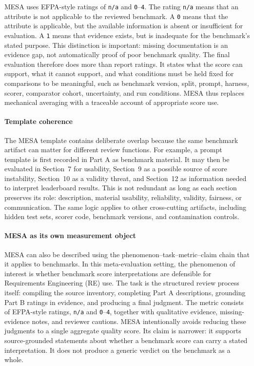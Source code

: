 \documentclass[conference]{IEEEtran}
\begin{document}
    MESA uses EFPA-style ratings of \texttt{n/a} and \texttt{0}--\texttt{4}. The rating \texttt{n/a} means that an attribute is not applicable to the reviewed benchmark. A \texttt{0} means that the attribute is applicable, but the available information is absent or insufficient for evaluation. A \texttt{1} means that evidence exists, but is inadequate for the benchmark's stated purpose. This distinction is important: missing documentation is an evidence gap, not automatically proof of poor benchmark quality. The final evaluation therefore does more than report ratings. It states what the score can support, what it cannot support, and what conditions must be held fixed for comparisons to be meaningful, such as benchmark version, split, prompt, harness, scorer, comparator cohort, uncertainty, and run conditions. MESA thus replaces mechanical averaging with a traceable account of appropriate score use.
    
    \paragraph{Template coherence}
    The MESA template contains deliberate overlap because the same benchmark artifact can matter for different review functions. For example, a prompt template is first recorded in Part A as benchmark material. It may then be evaluated in Section~7 for usability, Section~9 as a possible source of score instability, Section~10 as a validity threat, and Section~12 as information needed to interpret leaderboard results. This is not redundant as long as each section preserves its role: description, material usability, reliability, validity, fairness, or communication. The same logic applies to other cross-cutting artifacts, including hidden test sets, scorer code, benchmark versions, and contamination controls.
    
    \paragraph{MESA as its own measurement object}
    MESA can also be described using the phenomenon--task--metric--claim chain that it applies to benchmarks. In this meta-evaluation setting, the phenomenon of interest is whether benchmark score interpretations are defensible for Requirements Engineering (RE) use. The task is the structured review process itself: compiling the source inventory, completing Part A descriptions, grounding Part B ratings in evidence, and producing a final judgment. The metric consists of EFPA-style ratings, \texttt{n/a} and \texttt{0}--\texttt{4}, together with qualitative evidence, missing-evidence notes, and reviewer cautions. MESA intentionally avoids reducing these judgments to a single aggregate quality score. Its claim is narrower: it supports source-grounded statements about whether a benchmark score can carry a stated interpretation. It does not produce a generic verdict on the benchmark as a whole.
    
\end{document}
